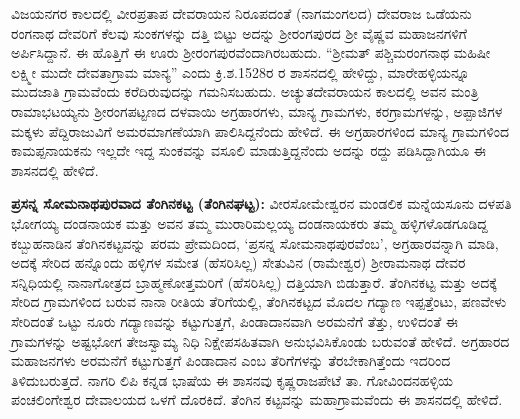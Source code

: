 ವಿಜಯನಗರ ಕಾಲದಲ್ಲಿ ವೀರಪ್ರತಾಪ ದೇವರಾಯನ ನಿರೂಪದಂತೆ (ನಾಗಮಂಗಲದ) ದೇವರಾಜ ಒಡೆಯನು ರಂಗನಾಥ ದೇವರಿಗೆ ಕೆಲವು ಸುಂಕಗಳನ್ನು ದತ್ತಿ ಬಿಟ್ಟು ಅದನ್ನು ಶ‍್ರೀರಂಗಪುರದ ಶ‍್ರೀ ವೈಷ್ಣವ ಮಹಾಜನಗಳಿಗೆ ಅರ್ಪಿಸಿದ್ದಾನೆ. ಈ ಹೊತ್ತಿಗೆ ಈ ಊರು ಶ‍್ರೀರಂಗಪುರವೆಂದಾಗಿರಬಹುದು. “ಶ‍್ರೀಮತ್​ ಪಶ್ಚಿಮರಂಗನಾಥ ಮಹಿಷೀ ಲಕ್ಷ್ಮೀ ಮುದೇ ದೇವತಾಗ್ರಾಮ ಮಾನ್ಯ” ಎಂದು ಕ್ರಿ.ಶ.1528ರ ರ ಶಾಸನದಲ್ಲಿ ಹೇಳಿದ್ದು, ಮಾರೇಹಳ್ಳಿಯನ್ನೂ ಮುದಜಾತಿ ಗ್ರಾಮವೆಂದು ಕರೆದಿರುವುದನ್ನು ಗಮನಿಸಬಹುದು. ಅಚ್ಯುತದೇವರಾಯನ ಕಾಲದಲ್ಲಿ ಅವನ ಮಂತ್ರಿ ರಾಮಾಭಟಯ್ಯನು ಶ‍್ರೀರಂಗಪಟ್ಟಣದ ದಳವಾಯಿ ಅಗ್ರಹಾರಗಳು, ಮಾನ್ಯ ಗ್ರಾಮಗಳು, ಕರಗ್ರಾಮಗಳನ್ನು, ಅಪ್ಪಾಜಿಗಳ ಮಕ್ಕಳು ಪೆದ್ದಿರಾಜುವಿಗೆ ಅಮರಮಾಗಣೆಯಾಗಿ ಪಾಲಿಸಿದ್ದನೆಂದು ಹೇಳಿದೆ. ಈ ಅಗ್ರಹಾರಗಳಿಂದ ಮಾನ್ಯ ಗ್ರಾಮಗಳಿಂದ ಕಾಮಪ್ಪನಾಯಕನು ಇಲ್ಲದೇ ಇದ್ದ ಸುಂಕವನ್ನು ವಸೂಲಿ ಮಾಡುತ್ತಿದ್ದನೆಂದು ಅದನ್ನು ರದ್ದು ಪಡಿಸಿದ್ದಾಗಿಯೂ ಈ ಶಾಸನದಲ್ಲಿ ಹೇಳಿದೆ.

\textbf{ಪ್ರಸನ್ನ ಸೋಮನಾಥಪುರವಾದ ತೆಂಗಿನಕಟ್ಟ (ತೆಂಗಿನಘಟ್ಟ):} ವೀರಸೋಮೇಶ್ವರನ ಮಂಡಲಿಕ ಮನ್ನೆಯಸೂನು ದಳಪತಿ ಭೋಗಯ್ಯ ದಂಡನಾಯಕ ಮತ್ತು ಅವನ ತಮ್ಮ ಮುರಾರಿಮಲ್ಲಯ್ಯ ದಂಡನಾಯಕರು ತಮ್ಮ ಹಳ್ಳಿಗಳೊಡಗೂಡಿದ್ದ ಕಬ್ಬುಹನಾಡಿನ ತೆಂಗಿನಕಟ್ಟವನ್ನು ಪರಮ ಪ್ರೇಮದಿಂದ, `ಪ್ರಸನ್ನ ಸೋಮನಾಥಪುರವೆಂಬ', ಅಗ್ರಹಾರವನ್ನಾಗಿ ಮಾಡಿ, ಅದಕ್ಕೆ ಸೇರಿದ ಹನ್ನೊಂದು ಹಳ್ಳಿಗಳ ಸಮೇತ (ಹೆಸರಿಸಿಲ್ಲ) ಸೇತುವಿನ (ರಾಮೇಶ್ವರ) ಶ‍್ರೀರಾಮನಾಥ ದೇವರ ಸನ್ನಿಧಿಯಲ್ಲಿ ನಾನಾಗೋತ್ರದ ಬ್ರಾಹ್ಮಣೋತ್ತಮರಿಗೆ (ಹೆಸರಿಸಿಲ್ಲ) ದತ್ತಿಯಾಗಿ ಬಿಡುತ್ತಾರೆ. ತೆಂಗಿನಕಟ್ಟ ಮತ್ತು ಅದಕ್ಕೆ ಸೇರಿದ ಗ್ರಾಮಗಳಿಂದ ಬರುವ ನಾನಾ ರೀತಿಯ ತೆರಿಗೆಯಲ್ಲಿ, ತೆಂಗಿನಕಟ್ಟದ ಮೊದಲ ಗದ್ಯಾಣ ಇಪ್ಪತ್ತೆಂಟು, ಪಣವೇಳು ಸೇರಿದಂತೆ ಒಟ್ಟು ನೂರು ಗದ್ಯಾಣವನ್ನು ಕಟ್ಟುಗುತ್ತಗೆ, ಪಿಂಡಾದಾನವಾಗಿ ಅರಮನೆಗೆ ತೆತ್ತು, ಉಳಿದಂತೆ ಈ ಗ್ರಾಮಗಳನ್ನು ಅಷ್ಟಭೋಗ ತೇಜಸ್ವಾಮ್ಯ ನಿಧಿ ನಿಕ್ಷೇಪಸಹಿತವಾಗಿ ಅನುಭವಿಸಿಕೊಂಡು ಬರುವಂತೆ ಹೇಳಿದೆ. ಅಗ್ರಹಾರದ ಮಹಾಜನಗಳು ಅರಮನೆಗೆ ಕಟ್ಟುಗುತ್ತಗೆ ಪಿಂಡಾದಾನ ಎಂಬ ತೆರಿಗೆಗಳನ್ನು ತೆರಬೇಕಾಗಿತ್ತೆಂದು ಇದರಿಂದ ತಿಳಿದುಬರುತ್ತದೆ. ನಾಗರಿ ಲಿಪಿ ಕನ್ನಡ ಭಾಷೆಯ ಈ ಶಾಸನವು ಕೃಷ್ಣರಾಜಪೇಟೆ ತಾ. ಗೋವಿಂದನಹಳ್ಳಿಯ ಪಂಚಲಿಂಗೇಶ್ವರ ದೇವಾಲಯದ ಒಳಗೆ ದೊರಕಿದೆ. ತೆಂಗಿನ ಕಟ್ಟವನ್ನು ಮಹಾಗ್ರಾಮವೆಂದು ಈ ಶಾಸನದಲ್ಲಿ ಹೇಳಿದೆ.

